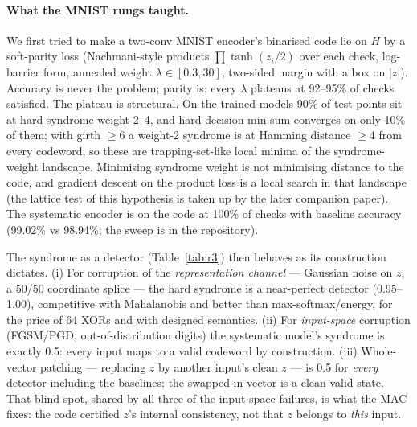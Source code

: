 \documentclass[10pt,twocolumn]{article}
\begin{document}
\paragraph{What the MNIST rungs taught.} We first tried to make a two-conv MNIST
encoder's binarised code lie on $H$ by a soft-parity loss (Nachmani-style products
$\prod\tanh(z_i/2)$ over each check, log-barrier form, annealed weight
$\lambda\in[0.3,30]$, two-sided margin with a box on $|z|$). Accuracy is never the
problem; parity is: every $\lambda$ plateaus at 92--95\% of checks satisfied. The
plateau is structural. On the trained models 90\% of test points sit at hard
syndrome weight 2--4, and hard-decision min-sum converges on only 10\% of them; with
girth $\ge6$ a weight-2 syndrome is at Hamming distance $\ge4$ from every codeword, so
these are trapping-set-like local minima of the syndrome-weight landscape. Minimising
syndrome weight is not minimising distance to the code, and gradient descent on the
product loss is a local search in that landscape (the lattice test of this
hypothesis is taken up by the later companion paper). The systematic encoder is on the code at 100\% of
checks with baseline accuracy (99.02\% vs 98.94\%; the sweep is in the repository).

The syndrome as a detector (Table~\ref{tab:r3}) then behaves as its construction
dictates. (i) For corruption of the \emph{representation channel} --- Gaussian noise
on $z$, a 50/50 coordinate splice --- the hard syndrome is a near-perfect detector
(0.95--1.00), competitive with Mahalanobis and better than max-softmax/energy, for the
price of 64 XORs and with designed semantics. (ii) For \emph{input-space} corruption
(FGSM/PGD, out-of-distribution digits) the systematic model's syndrome is exactly
0.5: every input maps to a valid codeword by construction. (iii) Whole-vector
patching --- replacing $z$ by another input's clean $z$ --- is 0.5 for \emph{every}
detector including the baselines: the swapped-in vector is a clean valid state. That
blind spot, shared by all three of the input-space failures, is what the MAC fixes:
the code certified $z$'s internal consistency, not that $z$ belongs to \emph{this}
input.
\end{document}
